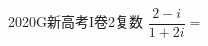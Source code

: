 
\begin{problem}{2020}{G}{新高考I卷}{2}{复数}
$ \dfrac{2-i}{1+2i}= $
\begin{choices}
\end{choices}
\end{problem}

\begin{answer}

\end{answer}

\begin{solutions}

\end{solutions}